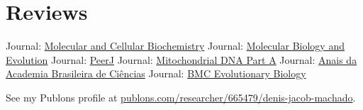 
\section{Reviews}

	    {Journal: \href{https://www.springer.com/journal/11010/?gclid=Cj0KCQjwoJX8BRCZARIsAEWBFMLKBYnPcerYvwBvi0o_0fPoNuCnGz_5XU9lYKC91oSA7LozsZKev0saAuNLEALw_wcB}{Molecular and Cellular Biochemistry}}
	\cvline{---}
		{Journal: \href{https://academic.oup.com/mbe}{Molecular Biology and Evolution}}
	\cvline{---}
		{Journal: \href{https://peerj.com/}{PeerJ}}
	\cvline{---}
		{Journal: \href{https://www.tandfonline.com/loi/imdn20}{Mitochondrial DNA Part A}}
	    {Journal: \href{https://www.scielo.br/scielo.php?script=sci_serial&pid=0001-3765&lng=en&nrm=iso}{Anais da Academia Brasileira de Ciências}}
	\cvline{---}
		{Journal: \href{https://bmcevolbiol.biomedcentral.com/}{BMC Evolutionary Biology}}

    {\color{MyLightBlue} See my Publons profile at  \href{https://publons.com/researcher/665479/denis-jacob-machado/}{publons.com/researcher/665479/denis-jacob-machado}.\\}